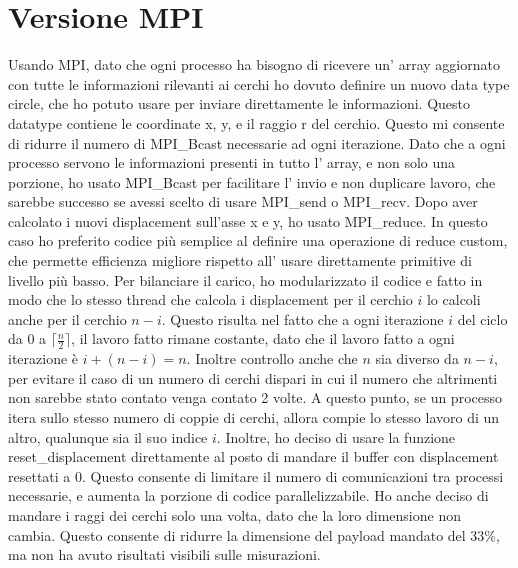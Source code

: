 \documentclass[a4paper,11pt, twoside]{report}
\begin{document}
\section*{Versione MPI}
Usando MPI, dato che ogni processo ha bisogno di ricevere un' array aggiornato con tutte le informazioni rilevanti ai cerchi
ho dovuto definire un nuovo data type circle, che ho potuto usare per inviare direttamente le informazioni.
Questo datatype contiene le coordinate x, y, e il raggio r del cerchio. %
Questo mi consente di ridurre il numero di MPI\_Bcast necessarie ad ogni iterazione.
Dato che a ogni processo servono le informazioni presenti in tutto l' array, e non solo una porzione, ho usato MPI\_Bcast per facilitare l' invio e non duplicare lavoro,
che sarebbe successo se avessi scelto di usare MPI\_send o  MPI\_recv.
Dopo aver calcolato i nuovi displacement sull'asse x e y, ho usato MPI\_reduce.
In questo caso ho preferito codice più semplice al definire una operazione di reduce custom,
che permette efficienza migliore rispetto all' usare direttamente primitive di livello più basso.
Per bilanciare il carico, ho modularizzato il codice e fatto in modo che lo stesso thread che calcola i displacement per il cerchio $i$ lo calcoli anche per il cerchio $n-i$.
Questo risulta nel fatto che a ogni iterazione $i$ del ciclo da $0$ a $\lceil \frac{n}{2} \rceil$, il lavoro fatto rimane costante, dato che il lavoro fatto a ogni iterazione è $i + (n-i) = n$.
Inoltre controllo anche che $n$ sia diverso da $n-i$, per evitare il caso di un numero di cerchi dispari in cui il numero che altrimenti non sarebbe stato contato venga contato 2 volte.
A questo punto, se un processo itera sullo stesso numero di coppie di cerchi, allora compie lo stesso lavoro di un altro, qualunque sia il suo indice $i$.
Inoltre, ho deciso di usare la funzione reset\_displacement direttamente al posto di mandare il buffer con displacement resettati a 0.
Questo consente di limitare il numero di comunicazioni tra processi necessarie, e aumenta la porzione di codice parallelizzabile.
Ho anche deciso di mandare i raggi dei cerchi solo una volta, dato che la loro dimensione non cambia.
Questo consente di ridurre la dimensione del payload mandato del 33\%, ma non ha avuto risultati visibili sulle misurazioni.
\end{document}
